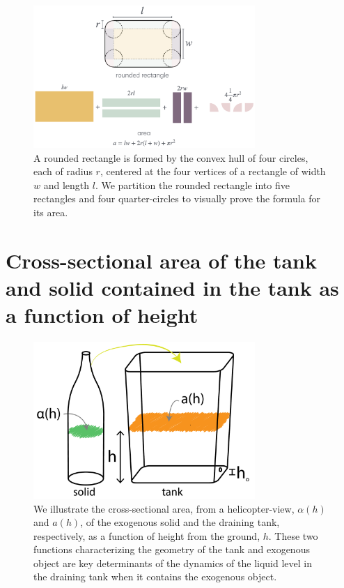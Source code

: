 \documentclass[a4paper,fleqn]{cas-sc}
\begin{document}
\begin{figure}[h!]
	\centering
	\includegraphics[width=0.75\textwidth]{../drawings_and_photos/rounded_rectangle.png} 
	\caption{A rounded rectangle \cite{rounded_rect} is formed by the convex hull of four circles, each of radius $r$, centered at the four vertices of a rectangle of width $w$ and length $l$. We partition the rounded rectangle into five rectangles and four quarter-circles to visually prove the formula for its area.} \label{fig:rounded_rectangle}
\end{figure}

\clearpage

\section{Cross-sectional area of the tank and solid contained in the tank as a function of height}

\begin{figure}[h!]
	\centering
	\includegraphics[width=0.75\textwidth]{../drawings_and_photos/a_of_h.pdf} 
	\caption{We illustrate the cross-sectional area, from a helicopter-view, $\alpha(h)$ and $a(h)$, of the exogenous solid and the draining tank, respectively, as a function of height from the ground, $h$. These two functions characterizing the geometry of the tank and exogenous object are key determinants of the dynamics of the liquid level in the draining tank when it contains the exogenous object.} \label{fig:a_and_alpha_of_h_illustration}
\end{figure}
\end{document}
